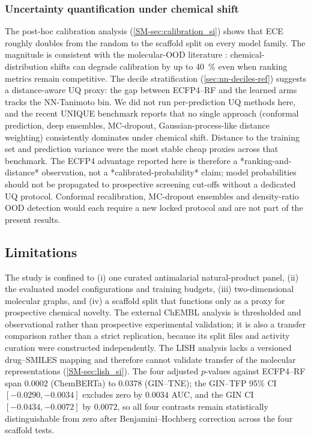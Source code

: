 \documentclass[11pt,a4paper]{article}
\begin{document}
\subsubsection{Uncertainty quantification under chemical shift}

The post-hoc calibration analysis (\cref{SM-sec:calibration_si}) shows that ECE roughly doubles from the random to the scaffold split on every model family. The magnitude is consistent with the molecular-OOD literature \citep{sheridan2024realworld}: chemical-distribution shifts can degrade calibration by up to \qty{40}{\percent} even when ranking metrics remain competitive. The decile stratification (\cref{sec:nn-deciles-ref}) suggests a distance-aware UQ proxy: the gap between ECFP4--RF and the learned arms tracks the NN-Tanimoto bin. We did not run per-prediction UQ methods here, and the recent UNIQUE benchmark \citep{unique2026uq} reports that no single approach (conformal prediction, deep ensembles, MC-dropout, Gaussian-process-like distance weighting) consistently dominates under chemical shift. Distance to the training set and prediction variance were the most stable cheap proxies across that benchmark. The ECFP4 advantage reported here is therefore a *ranking-and-distance* observation, not a *calibrated-probability* claim; model probabilities should not be propagated to prospective screening cut-offs without a dedicated UQ protocol. Conformal recalibration, MC-dropout ensembles and density-ratio OOD detection would each require a new locked protocol and are not part of the present results.

\subsection{Limitations}

The study is confined to (i) one curated antimalarial natural-product panel, (ii) the evaluated model configurations and training budgets, (iii) two-dimensional molecular graphs, and (iv) a scaffold split that functions only as a proxy for prospective chemical novelty. The external ChEMBL analysis is thresholded and observational rather than prospective experimental validation; it is also a transfer comparison rather than a strict replication, because its split files and activity curation were constructed independently. The LISH analysis lacks a versioned drug--SMILES mapping and therefore cannot validate transfer of the molecular representations (\cref{SM-sec:lish_si}). The four adjusted $p$-values against ECFP4--RF span $\num{0.0002}$ (ChemBERTa) to $\num{0.0378}$ (GIN--TNE); the GIN--TFP 95\% CI $[-\num{0.0290}, -\num{0.0034}]$ excludes zero by $\num{0.0034}$ AUC, and the GIN CI $[-\num{0.0434}, -\num{0.0072}]$ by $\num{0.0072}$, so all four contrasts remain statistically distinguishable from zero after Benjamini--Hochberg correction across the four scaffold tests.
\end{document}
